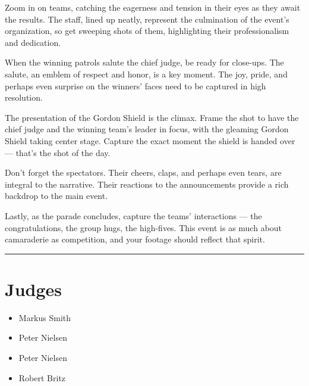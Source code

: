 \documentclass[10pt]{article}
\begin{document}
Zoom in on teams, catching the eagerness and tension in their eyes as they await the results. The staff, lined up neatly, represent the culmination of the event's organization, so get sweeping shots of them, highlighting their professionalism and dedication.



When the winning patrols salute the chief judge, be ready for close-ups. The salute, an emblem of respect and honor, is a key moment. The joy, pride, and perhaps even surprise on the winners' faces need to be captured in high resolution.



The presentation of the Gordon Shield is the climax. Frame the shot to have the chief judge and the winning team's leader in focus, with the gleaming Gordon Shield taking center stage. Capture the exact moment the shield is handed over — that's the shot of the day.



Don't forget the spectators. Their cheers, claps, and perhaps even tears, are integral to the narrative. Their reactions to the announcements provide a rich backdrop to the main event.



Lastly, as the parade concludes, capture the teams' interactions — the congratulations, the group hugs, the high-fives. This event is as much about camaraderie as competition, and your footage should reflect that spirit.
\vspace{0.5cm}
	\hrule
	\vspace{0.5cm}
		\section*{\faUsers \: Judges}

		

	\begin{multicols}{2}

		\begin{itemize}
									\item Markus Smith
									\item Peter Nielsen
						\end{itemize}

		\vfill\null
		\columnbreak

		\begin{itemize}
									\item Peter Nielsen
									\item Robert Britz
						\end{itemize}

		\vfill\null

		\end{multicols}
\end{document}
